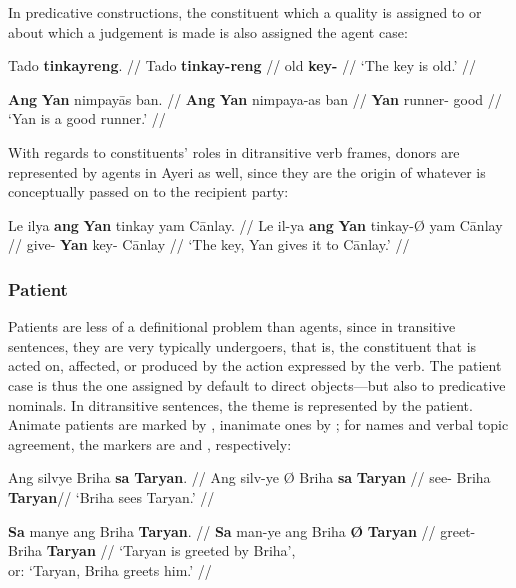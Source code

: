 \xe

In predicative constructions, the constituent which a quality is assigned to or 
about which a judgement is made is also assigned the agent case:

\pex
\a\begingl
	\gla Tado \textbf{tinkayreng}. //
	\glb Tado \textbf{tinkay-reng} //
	\glc old \textbf{key-\AargI{}} //
	\glft `The key is old.' //
\endgl

\a\begingl
	\gla \textbf{Ang} \textbf{Yan} nimpayās ban. //
	\glb \textbf{Ang} \textbf{Yan} nimpaya-as ban //
	\glc \textbf{\Aarg{}} \textbf{Yan} runner-\Parg{} good //
	\glft `Yan is a good runner.' //
\endgl

\xe


With regards to constituents' roles in ditransitive verb frames, donors are 
represented by agents in Ayeri as well, since they are the origin of whatever 
is conceptually passed on to the recipient party:

\ex\begingl
	\gla Le ilya \textbf{ang} \textbf{Yan} tinkay yam Cānlay. //
	\glb Le il-ya \textbf{ang} \textbf{Yan} tinkay-Ø yam Cānlay //
	\glc \PatT{} give-\TsgM{} \textbf{\Aarg{}} \textbf{Yan} key-\Top{} 
		\Dat{} Cānlay //
	\glft `The key, Yan gives it to Cānlay.' //
\endgl\xe

\subsubsection{Patient}

Patients are less of a definitional problem than agents, since in transitive 
sentences, they are very typically undergoers, that is, the constituent that is 
acted on, affected, or produced by the action expressed by the verb. The patient 
case is thus the one assigned by default to direct objects---but also to 
predicative nominals. In ditransitive sentences, the theme is represented by the 
patient. Animate patients are marked by , inanimate ones by 
; for names and verbal topic agreement, the markers are 
 and , respectively:

\pex
\a\begingl
	\gla Ang silvye {} Briha \textbf{sa} \textbf{Taryan}. //
	\glb Ang silv-ye Ø Briha \textbf{sa} \textbf{Taryan} //
	\glc \AgtT{} see-\TsgF{} \Top{} Briha \textbf{\Parg{}} \textbf{Taryan}//
	\glft `Briha sees Taryan.' //
\endgl

\a\begingl
	\gla \textbf{Sa} manye ang Briha \textbf{{}} \textbf{Taryan}. //
	\glb \textbf{Sa} man-ye ang Briha \textbf{Ø} \textbf{Taryan} //
	\glc \textbf{\PatT{}} greet-\TsgF{} \Aarg{} Briha \textbf{\Top{}} 
		\textbf{Taryan} //
	\glft `Taryan is greeted by Briha',\\
		or: `Taryan, Briha greets him.' //
\endgl

